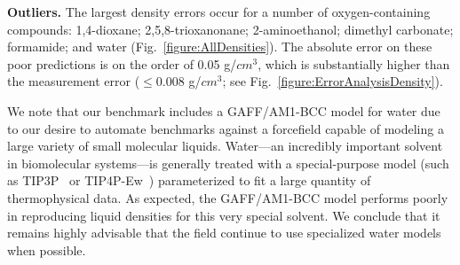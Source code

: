 \documentclass[aip, jcp, reprint]{revtex4-1}  %
\begin{document}

{\bf Outliers.}
The largest density errors occur for a number of oxygen-containing compounds: 1,4-dioxane; 2,5,8-trioxanonane; 2-aminoethanol; dimethyl carbonate; formamide; and water (Fig.~\ref{figure:AllDensities}).
The absolute error on these poor predictions is on the order of 0.05  g/$cm^{3}$, which is substantially higher than the measurement error ($\le0.008$ g/$cm^{3}$; see Fig.~\ref{figure:ErrorAnalysisDensity}).  

We note that our benchmark includes a GAFF/AM1-BCC model for water due to our desire to automate benchmarks against a forcefield capable of modeling a large variety of small molecular liquids.
Water---an incredibly important solvent in biomolecular systems---is generally treated with a special-purpose model (such as TIP3P~\cite{jorgensen1983comparison} or TIP4P-Ew~\cite{horn2004}) parameterized to fit a large quantity of thermophysical data.
As expected, the GAFF/AM1-BCC model performs poorly in reproducing liquid densities for this very special solvent.
We conclude that it remains highly advisable that the field continue to use specialized water models when possible.

\end{document}
